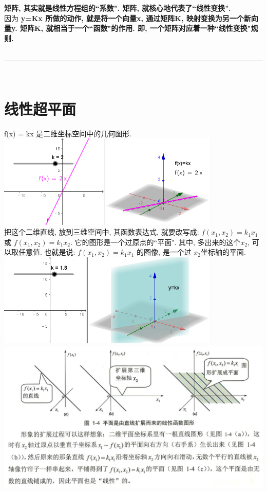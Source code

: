 \documentclass[UTF8]{ctexart}
\begin{document}
\textbf{矩阵, 其实就是线性方程组的``系数". 矩阵, 就核心地代表了``线性变换".}\\
因为 \textbf{y=Kx 所做的动作, 就是将一个向量x, 通过矩阵K, 映射变换为另一个新向量y. 矩阵K, 就相当于一个``函数"的作用. 即, 一个矩阵对应着一种``线性变换"规则.} \\

~\\
\hrule
~\\

\section{线性超平面}


f(x) = kx 是二维坐标空间中的几何图形. \\

\includegraphics[width=0.8\textwidth]{img/0112.png}\\

把这个二维直线, 放到三维空间中, 其函数表达式, 就要改写成: $f\left( x_1,x_2 \right) =k_1x_1$ 或 $f\left( x_1,x_2 \right) =k_1x_2$. 它的图形是一个过原点的``平面". 其中, 多出来的这个$x_2$, 可以取任意值. 也就是说:  $f\left( x_1,x_2 \right) =k_1x_1$ 的图像, 是一个过 $x_2$坐标轴的平面. \\

\includegraphics[width=0.8\textwidth]{img/0113.png}\\

\includegraphics[width=1\textwidth]{img/0114.png}\\
\end{document}
